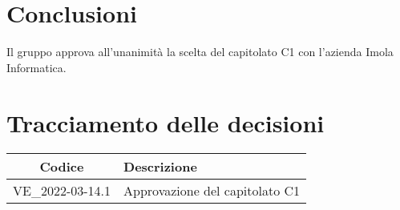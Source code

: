 \section{Conclusioni}
Il gruppo approva all'unanimità la scelta del capitolato C1 con l'azienda Imola Informatica.
\newpage
	
\section*{Tracciamento delle decisioni}
\renewcommand{\arraystretch}{1.8} %
	\begin{tabular}{ |c|l| }
		\hline
		\textbf{Codice} & \textbf{Descrizione} \\
		\hline
		VE\_2022-03-14.1 & Approvazione del capitolato C1 \\
		\hline
	\end{tabular}